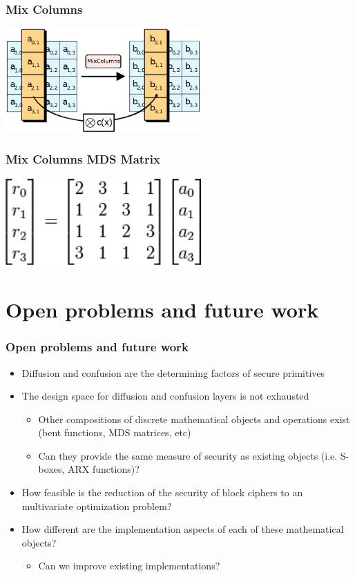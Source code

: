 \documentclass[handout]{beamer}
\begin{document}
\begin{frame}
	\frametitle{Mix Columns}
	\begin{center}
      		\includegraphics[width=75mm]{images/mix.png}
	\end{center}
\end{frame}

\begin{frame}
	\frametitle{Mix Columns MDS Matrix}
	\begin{center}
      		\includegraphics[width=75mm]{images/mix_ops.png} %
	\end{center}
\end{frame}

\section{Open problems and future work}
\begin{frame}
	\frametitle{Open problems and future work}
	\begin{itemize}
		\item Diffusion and confusion are the determining factors of secure primitives
		\pause
		\item The design space for diffusion and confusion layers is not exhausted
		\begin{itemize}
			\item Other compositions of discrete mathematical objects and operations exist (bent functions, MDS matrices, etc)
			\item Can they provide the same measure of security as existing objects (i.e. S-boxes, ARX functions)?
		\end{itemize}
		\pause
		\item How feasible is the reduction of the security of block ciphers to an multivariate optimization problem?
		\item How different are the implementation aspects of each of these mathematical objects?
		\begin{itemize}
			\item Can we improve existing implementations?
		\end{itemize}
	\end{itemize}
\end{frame}
\end{document}
